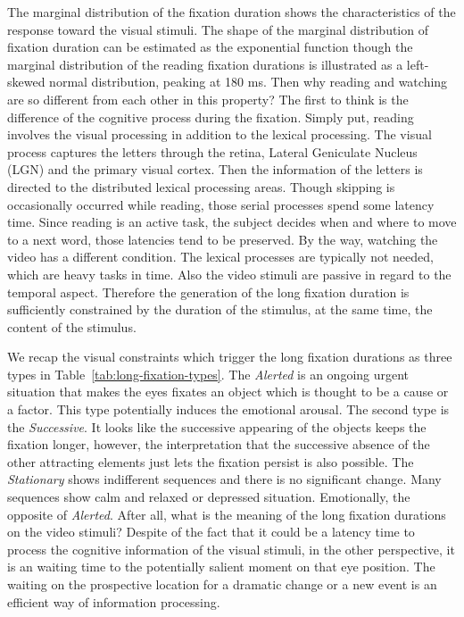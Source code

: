 \documentclass[10pt,letterpaper]{article}
\begin{document}
The marginal distribution of the fixation duration shows the characteristics of the response toward the visual stimuli. The shape of the marginal distribution of fixation duration can be estimated as the exponential function though the marginal distribution of the reading fixation durations is illustrated as a left-skewed normal distribution, peaking at 180 ms. Then why reading and watching are so different from each other in this property? The first to think is the difference of the cognitive process during the fixation. Simply put, reading involves the visual processing in addition to the lexical processing. The visual process captures the letters through the retina, Lateral Geniculate Nucleus (LGN) and the primary visual cortex. Then the information of the letters is directed to the distributed lexical processing areas. Though skipping is occasionally occurred while reading, those serial processes spend some latency time. Since reading is an active task, the subject decides when and where to move to a next word, those latencies tend to be preserved. By the way, watching the video has a different condition. The lexical processes are typically not needed, which are heavy tasks in time. Also the video stimuli are passive in regard to the temporal aspect. Therefore the generation of the long fixation duration is sufficiently constrained by the duration of the stimulus, at the same time, the content of the stimulus. 

We recap the visual constraints which trigger the long fixation durations as three types in Table~\ref{tab:long-fixation-types}. The \textit{Alerted} is an ongoing urgent situation that makes the eyes fixates an object which is thought to be a cause or a factor. This type potentially induces the emotional arousal. The second type is the \textit{Successive}. It looks like the successive appearing of the objects keeps the fixation longer, however, the interpretation that the successive absence of the other attracting elements just lets the fixation persist is also possible. The \textit{Stationary} shows indifferent sequences and there is no significant change. Many sequences show calm and relaxed or depressed situation. Emotionally, the opposite of \textit{Alerted}. After all, what is the meaning of the long fixation durations on the video stimuli? Despite of the fact that it could be a latency time to process the cognitive information of the visual stimuli, in the other perspective, it is an waiting time to the potentially salient moment on that eye position. The waiting on the prospective location for a dramatic change or a new event is an efficient way of information processing.
\end{document}
